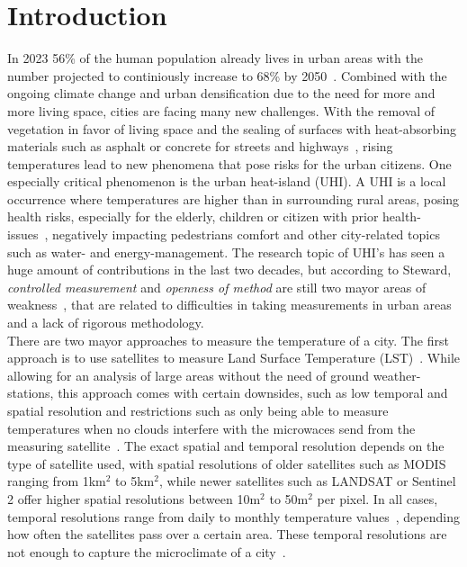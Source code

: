 
\chapter{Introduction}
\label{chap:Introduction}

In 2023 56\% of the human population already lives in urban areas with the number projected to continiously increase to 68\% by 2050~\cite{who2018projections}. Combined with the ongoing climate change and urban densification due to the need for more and more living space, cities are facing many new challenges. With the removal of vegetation in favor of living space and the sealing of surfaces with heat-absorbing materials such as asphalt or concrete for streets and highways~\cite{gret2020urban}, rising temperatures lead to new phenomena that pose risks for the urban citizens. One especially critical phenomenon is the urban heat-island (UHI). A UHI is a local occurrence where temperatures are higher than in surrounding rural areas, posing health risks, especially for the elderly, children or citizen with prior health-issues~\cite{martin2015alternative}, negatively impacting pedestrians comfort and other city-related topics such as water- and energy-management. The research topic of UHI's has seen a huge amount of contributions in the last two decades, but according to Steward, \textit{controlled measurement} and \textit{openness of method} are still two mayor areas of weakness~\cite{stewart2011systematic}, that are related to difficulties in taking measurements in urban areas~\cite{oke2006guideline} and a lack of rigorous methodology.\\
There are two mayor approaches to measure the temperature of a city. The first approach is to use satellites to measure Land Surface Temperature (LST)~\cite{peng2012surface}. While allowing for an analysis of large areas without the need of ground weather-stations, this approach comes with certain downsides, such as low temporal and spatial resolution and restrictions such as only being able to measure temperatures when no clouds interfere with the microwaces send from the measuring satellite~\cite{zhang2015estimation}. The exact spatial and temporal resolution depends on the type of satellite used, with spatial resolutions of older satellites such as MODIS ranging from 1km$^2$ to 5km$^2$, while newer satellites such as LANDSAT or Sentinel 2 offer higher spatial resolutions between 10m$^2$ to 50m$^2$ per pixel. In all cases, temporal resolutions range from daily to monthly temperature values~\cite{ghent2022esalst}, depending how often the satellites pass over a certain area. These temporal resolutions are not enough to capture the microclimate of a city~\cite{voelkel2017towards}.\\
